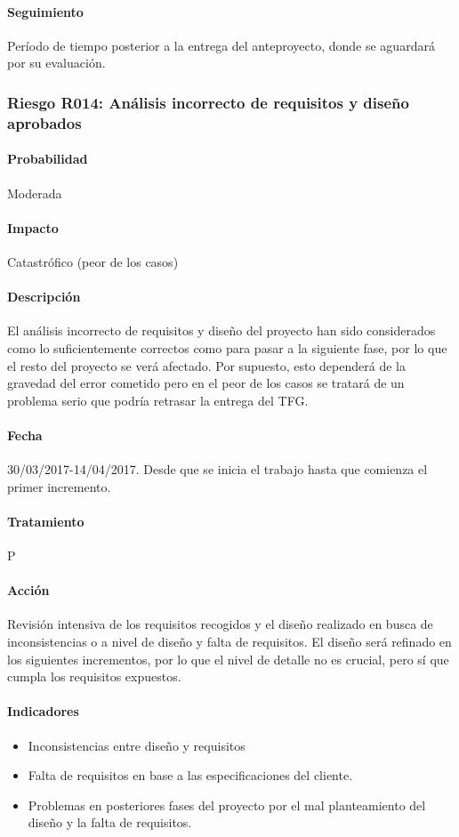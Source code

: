 \documentclass[10pt,a4paper]{article}
\begin{document}
				\paragraph{Seguimiento}	Período de tiempo posterior a la entrega del anteproyecto, donde se aguardará por su evaluación.
				
			\subsubsection{Riesgo R014: Análisis incorrecto de requisitos y diseño aprobados}
				\paragraph{Probabilidad} Moderada
				\paragraph{Impacto}	Catastrófico (peor de los casos)
				\paragraph{Descripción} El análisis incorrecto de requisitos y diseño del proyecto han sido considerados como lo suficientemente correctos como para pasar a la siguiente fase, por lo que el resto del proyecto se verá afectado. Por supuesto, esto dependerá de la gravedad del error cometido pero en el peor de los casos se tratará de un problema serio que podría retrasar la entrega del TFG.
				\paragraph{Fecha} 30/03/2017-14/04/2017. Desde que se inicia el trabajo hasta que comienza el primer incremento.
				\paragraph{Tratamiento} P
				\paragraph{Acción} Revisión intensiva de los requisitos recogidos y el diseño realizado en busca de inconsistencias o a nivel de diseño y falta de requisitos. El diseño será refinado en los siguientes incrementos, por lo que el nivel de detalle no es crucial, pero sí que cumpla los requisitos expuestos.
				\paragraph{Indicadores} 
				    \begin{itemize}
				        \item Inconsistencias entre diseño y requisitos
				        \item Falta de requisitos en base a las especificaciones del cliente.
				        \item Problemas en posteriores fases del proyecto por el mal planteamiento del diseño y la falta de requisitos.
				    \end{itemize}
\end{document}
